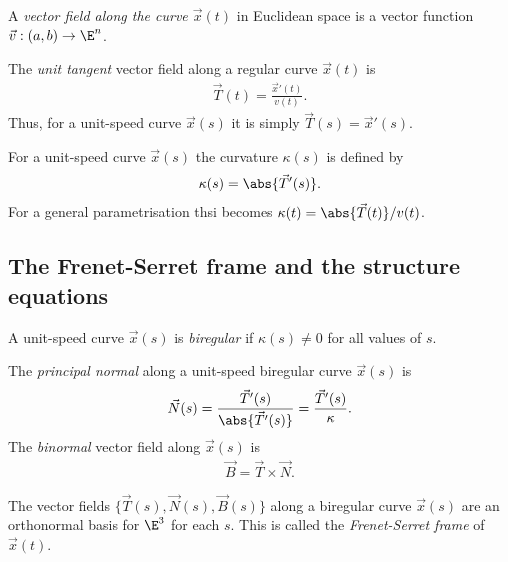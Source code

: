 \documentclass{article}
\begin{document}
\begin{definition}
    A \emph{vector field along the curve $\vec x(t)$} in Euclidean space is a vector
    function $\vec v:(a,b)\to\E^n$.
\end{definition}

\begin{definition}
    The \emph{unit tangent} vector field along a regular curve $\vec x(t)$ is 
    \begin{align*}
        \vec T(t) = \frac{\vec x'(t)}{v(t)}.
    \end{align*}
    Thus, for a unit-speed curve $\vec x(s)$ it is simply $\vec T(s)=\vec x'(s)$.
\end{definition}

\begin{definition}
    For a unit-speed curve $\vec x(s)$ the curvature $\kappa(s)$ is defined by
    \begin{align*}
        \kappa(s) = \abs{\vec T'(s)}.
    \end{align*}
    For a general parametrisation thsi becomes $\kappa(t)=\abs{\vec T(t)}/v(t)$.
\end{definition}

\subsection{The Frenet-Serret frame and the structure equations}

\begin{definition}
    A unit-speed curve $\vec x(s)$ is \emph{biregular} if $\kappa(s)\not=0$ for
    all values of $s$.
\end{definition}

\begin{definition}
    The \emph{principal normal} along a unit-speed biregular curve $\vec x(s)$ is
    \begin{align*}
        \vec N(s) = \frac{\vec T'(s)}{\abs{\vec T'(s)}}=\frac{\vec T'(s)}{\kappa}.
    \end{align*}
    The \emph{binormal} vector field along $\vec x(s)$ is
    \begin{align*}
        \vec B = \vec T \times \vec N.
    \end{align*}
\end{definition}

\begin{proposition}
    The vector fields $\{\vec T(s), \vec N(s), \vec B(s)\}$ along a biregular curve
    $\vec x(s)$ are an orthonormal basis for $\E^3$ for each $s$. This is called the
    \emph{Frenet-Serret frame} of $\vec x(t)$.
\end{proposition}
\end{document}
